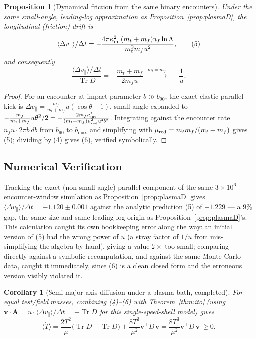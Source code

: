 \documentclass[12pt]{amsart}
\theoremstyle{plain}
\newtheorem{proposition}[theorem]{Proposition}
\newtheorem{corollary}[theorem]{Corollary}
\theoremstyle{remark}
\begin{document}
\begin{proposition}[Dynamical friction from the same binary encounters]\label{prop:plasmaA}
Under the same small-angle, leading-log approximation as Proposition~\ref{prop:plasmaD}, the longitudinal (friction) drift is
\begin{equation}
\langle\Delta v_\parallel\rangle/\Delta t = -\frac{4\pi\kappa_{\rm int}^2(m_t+m_f)n_f\ln\Lambda}{m_t^2m_fu^2}, \tag{5}
\end{equation}
and consequently
\begin{equation}
\frac{\langle\Delta v_\parallel\rangle/\Delta t}{\operatorname{Tr}D}=-\frac{m_t+m_f}{2m_fu}\ \xrightarrow{\ m_t=m_f\ }\ -\frac1u. \tag{6}
\end{equation}
\end{proposition}

\begin{proof}
For an encounter at impact parameter $b\gg b_{90}$, the exact elastic parallel kick is $\Delta v_\parallel=\frac{m_f}{m_t+m_f}u(\cos\theta-1)$, small-angle-expanded to $-\frac{m_f}{m_t+m_f}u\theta^2/2=-\frac{2m_f\kappa_{\rm int}^2}{(m_t+m_f)\mu_{\rm red}^2u^3b^2}$. Integrating against the encounter rate $n_fu\cdot2\pi b\,db$ from $b_{90}$ to $b_{\max}$ and simplifying with $\mu_{\rm red}=m_tm_f/(m_t+m_f)$ gives (5); dividing by (4) gives (6), verified symbolically.
\end{proof}

\subsection*{Numerical Verification}
Tracking the exact (non-small-angle) parallel component of the same $3\times10^6$-encounter-window simulation as Proposition~\ref{prop:plasmaD} gives $\langle\Delta v_\parallel\rangle/\Delta t=-1.120\pm0.001$ against the analytic prediction (5) of $-1.229$ --- a $9\%$ gap, the same size and same leading-log origin as Proposition~\ref{prop:plasmaD}'s. This calculation caught its own bookkeeping error along the way: an initial version of (5) had the wrong power of $u$ (a stray factor of $1/u$ from mis-simplifying the algebra by hand), giving a value $2\times$ too small; comparing directly against a symbolic recomputation, and against the same Monte Carlo data, caught it immediately, since (6) is a clean closed form and the erroneous version visibly violated it.

\begin{corollary}[Semi-major-axis diffusion under a plasma bath, completed]\label{cor:plasma}
For equal test/field masses, combining (4)--(6) with Theorem~\ref{thm:ito} (using $\mathbf v\cdot\mathbf A=u\cdot\langle\Delta v_\parallel\rangle/\Delta t=-\operatorname{Tr}D$ for this single-speed-shell model) gives
\begin{equation}
\langle\dot T\rangle = \frac{2T^2}{\mu}\big(\operatorname{Tr}D-\operatorname{Tr}D\big)+\frac{8T^3}{\mu^2}\mathbf v^\top D\,\mathbf v = \frac{8T^3}{\mu^2}\mathbf v^\top D\,\mathbf v\ \ge0. \tag{7}
\end{equation}
\end{corollary}
\end{document}
